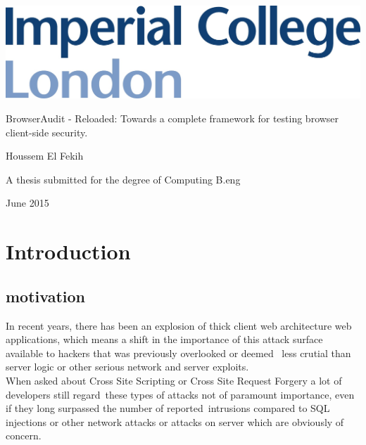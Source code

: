 \documentclass[a4paper,12pt]{report}
\begin{document}
\thispagestyle{empty}
\begin{center}
\begin{minipage}{0.75\linewidth}
    \centering
    \includegraphics[width=1\linewidth]{logo.jpg}
    \vspace{5cm}
    {\Large BrowserAudit - Reloaded: Towards a complete framework for testing browser client-side security. \par}
    \vspace{3cm}
    {\Large Houssem El Fekih\par}
    \vspace{3cm}
    {\Large A thesis submitted for the degree of Computing B.eng\par}
    \vspace{3cm}
    {\Large June 2015}
\end{minipage}
\end{center}
\clearpage


\begin{abstract}
 
\end{abstract}


\tableofcontents
\listoffigures
\listoftables

\pagebreak
{}

\section{Introduction}

\subsection{motivation}
In recent years, there has been an explosion of thick client web architecture web applications,
which means a shift in the importance of this attack surface available to hackers that was previously overlooked or deemed \
less crutial than server logic or other serious network and server exploits.\\

When asked about Cross Site Scripting or Cross Site Request Forgery a lot of developers still regard\
these types of attacks not of paramount importance, even if they long surpassed the number of reported\
intrusions compared to SQL injections or other network attacks or attacks on server which are obviously of concern.\\
\end{document}
